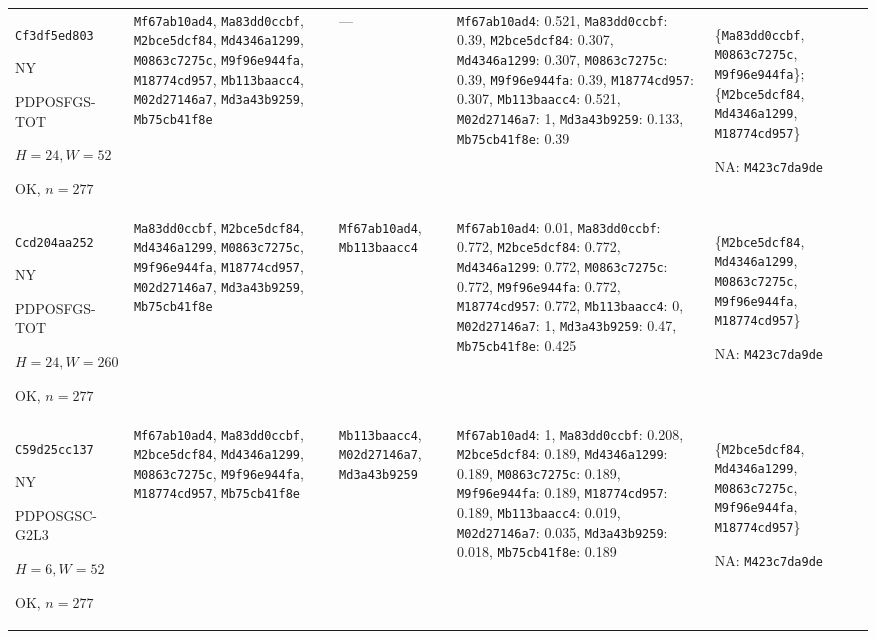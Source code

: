 \begin{longtable}{p{.15\linewidth}p{.17\linewidth}p{.17\linewidth}p{.25\linewidth}p{.14\linewidth}}
\texttt{Cf3df5ed803}\par NY\par PDPOSFGS-\allowbreak{}TOT\par $H=24,W=52$\par OK, $n=277$ & \texttt{Mf67ab10ad4}, \texttt{Ma83dd0ccbf}, \texttt{M2bce5dcf84}, \texttt{Md4346a1299}, \texttt{M0863c7275c}, \texttt{M9f96e944fa}, \texttt{M18774cd957}, \texttt{Mb113baacc4}, \texttt{M02d27146a7}, \texttt{Md3a43b9259}, \texttt{Mb75cb41f8e} & --- & \texttt{Mf67ab10ad4}: 0.521, \texttt{Ma83dd0ccbf}: 0.39, \texttt{M2bce5dcf84}: 0.307, \texttt{Md4346a1299}: 0.307, \texttt{M0863c7275c}: 0.39, \texttt{M9f96e944fa}: 0.39, \texttt{M18774cd957}: 0.307, \texttt{Mb113baacc4}: 0.521, \texttt{M02d27146a7}: 1, \texttt{Md3a43b9259}: 0.133, \texttt{Mb75cb41f8e}: 0.39 & \{\texttt{Ma83dd0ccbf}, \texttt{M0863c7275c}, \texttt{M9f96e944fa}\}; \{\texttt{M2bce5dcf84}, \texttt{Md4346a1299}, \texttt{M18774cd957}\}\par NA: \texttt{M423c7da9de} \\
\texttt{Ccd204aa252}\par NY\par PDPOSFGS-\allowbreak{}TOT\par $H=24,W=260$\par OK, $n=277$ & \texttt{Ma83dd0ccbf}, \texttt{M2bce5dcf84}, \texttt{Md4346a1299}, \texttt{M0863c7275c}, \texttt{M9f96e944fa}, \texttt{M18774cd957}, \texttt{M02d27146a7}, \texttt{Md3a43b9259}, \texttt{Mb75cb41f8e} & \texttt{Mf67ab10ad4}, \texttt{Mb113baacc4} & \texttt{Mf67ab10ad4}: 0.01, \texttt{Ma83dd0ccbf}: 0.772, \texttt{M2bce5dcf84}: 0.772, \texttt{Md4346a1299}: 0.772, \texttt{M0863c7275c}: 0.772, \texttt{M9f96e944fa}: 0.772, \texttt{M18774cd957}: 0.772, \texttt{Mb113baacc4}: 0, \texttt{M02d27146a7}: 1, \texttt{Md3a43b9259}: 0.47, \texttt{Mb75cb41f8e}: 0.425 & \{\texttt{M2bce5dcf84}, \texttt{Md4346a1299}, \texttt{M0863c7275c}, \texttt{M9f96e944fa}, \texttt{M18774cd957}\}\par NA: \texttt{M423c7da9de} \\
\texttt{C59d25cc137}\par NY\par PDPOSGSC-\allowbreak{}G2L3\par $H=6,W=52$\par OK, $n=277$ & \texttt{Mf67ab10ad4}, \texttt{Ma83dd0ccbf}, \texttt{M2bce5dcf84}, \texttt{Md4346a1299}, \texttt{M0863c7275c}, \texttt{M9f96e944fa}, \texttt{M18774cd957}, \texttt{Mb75cb41f8e} & \texttt{Mb113baacc4}, \texttt{M02d27146a7}, \texttt{Md3a43b9259} & \texttt{Mf67ab10ad4}: 1, \texttt{Ma83dd0ccbf}: 0.208, \texttt{M2bce5dcf84}: 0.189, \texttt{Md4346a1299}: 0.189, \texttt{M0863c7275c}: 0.189, \texttt{M9f96e944fa}: 0.189, \texttt{M18774cd957}: 0.189, \texttt{Mb113baacc4}: 0.019, \texttt{M02d27146a7}: 0.035, \texttt{Md3a43b9259}: 0.018, \texttt{Mb75cb41f8e}: 0.189 & \{\texttt{M2bce5dcf84}, \texttt{Md4346a1299}, \texttt{M0863c7275c}, \texttt{M9f96e944fa}, \texttt{M18774cd957}\}\par NA: \texttt{M423c7da9de} \\

\end{longtable}
